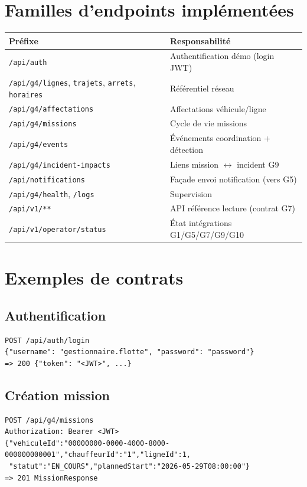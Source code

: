 \documentclass[12pt,a4paper]{report}
\begin{document}
\section{Familles d'endpoints implémentées}
\begin{center}
\small
\begin{tabular}{@{}lp{8.5cm}@{}}
\toprule
\textbf{Préfixe} & \textbf{Responsabilité} \\
\midrule
\texttt{/api/auth} & Authentification démo (login JWT) \\
\texttt{/api/g4/lignes}, \texttt{trajets}, \texttt{arrets}, \texttt{horaires} & Référentiel réseau \\
\texttt{/api/g4/affectations} & Affectations véhicule/ligne \\
\texttt{/api/g4/missions} & Cycle de vie missions \\
\texttt{/api/g4/events} & Événements coordination + détection \\
\texttt{/api/g4/incident-impacts} & Liens mission $\leftrightarrow$ incident G9 \\
\texttt{/api/notifications} & Façade envoi notification (vers G5) \\
\texttt{/api/g4/health}, \texttt{/logs} & Supervision \\
\texttt{/api/v1/**} & API référence lecture (contrat G7) \\
\texttt{/api/v1/operator/status} & État intégrations G1/G5/G7/G9/G10 \\
\bottomrule
\end{tabular}
\end{center}

\section{Exemples de contrats}

\subsection{Authentification}
\begin{lstlisting}
POST /api/auth/login
{"username": "gestionnaire.flotte", "password": "password"}
=> 200 {"token": "<JWT>", ...}
\end{lstlisting}

\subsection{Création mission}
\begin{lstlisting}
POST /api/g4/missions
Authorization: Bearer <JWT>
{"vehiculeId":"00000000-0000-4000-8000-000000000001","chauffeurId":"1","ligneId":1,
 "statut":"EN_COURS","plannedStart":"2026-05-29T08:00:00"}
=> 201 MissionResponse
\end{lstlisting}
\end{document}
